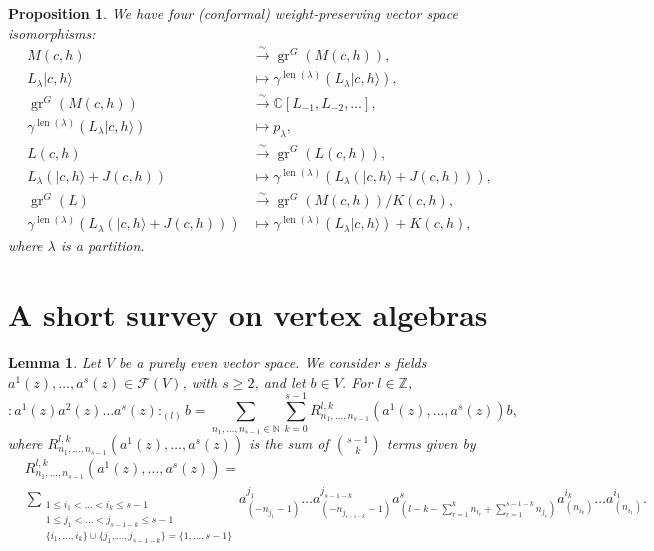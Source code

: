 \documentclass[a4paper, 12pt, reqno]{amsart}
\newtheorem{lemma}[theorem]{Lemma}
\newtheorem{proposition}[theorem]{Proposition}
\theoremstyle{remark}
\DeclareMathOperator{\len}{len}
\DeclareMathOperator{\gr}{gr}
\begin{document}
\begin{proposition}
  \label{prp:4}
  We have four (conformal) weight-preserving vector space isomorphisms:
  \begin{align*}
    M(c, h) &\xrightarrow{\sim} \gr^G(M(c, h)), \\
    L_{\lambda}|c, h\rangle &\mapsto \gamma^{\len(\lambda)}(L_{\lambda}|c, h\rangle), \\
    \gr^G(M(c, h)) &\xrightarrow{\sim} \mathbb{C}[L_{-1}, L_{-2}, \dots], \\
    \gamma^{\len(\lambda)}(L_{\lambda}|c, h\rangle) &\mapsto p_{\lambda}, \\
    L(c, h) &\xrightarrow{\sim} \gr^G(L(c, h)), \\
    L_{\lambda}(|c, h\rangle + J(c, h)) &\mapsto \gamma^{\len(\lambda)}(L_{\lambda}(|c, h\rangle + J(c, h))), \\
    \gr^G(L) &\xrightarrow{\sim} \gr^G(M(c, h))/K(c, h), \\
    \gamma^{\len(\lambda)}(L_{\lambda}(|c, h\rangle + J(c, h))) &\mapsto \gamma^{\len(\lambda)}(L_{\lambda}|c, h\rangle) + K(c, h),
  \end{align*}
  where $\lambda$ is a partition.
\end{proposition}

\section{A short survey on vertex algebras}
\label{sec:short-survey-vertex}

\begin{lemma}
  \label{lmm:1}
  Let $V$ be a purely even vector space.
  We consider $s$ fields $a^1(z), \dots, a^s(z) \in \mathcal{F}(V)$, with $s \ge 2$, and let $b \in V$.
  For $l \in \mathbb{Z}$,
  \begin{equation*}
    :a^1(z)a^2(z)\dots a^s(z):_{(l)}b = \sum_{n_1, \dots, n_{s - 1} \in \mathbb{N}}\sum_{k = 0}^{s - 1}R^{l, k}_{n_1, \dots, n_{s - 1}}(a^1(z), \dots, a^s(z))b,
  \end{equation*}
  where $R^{l, k}_{n_1, \dots, n_{s - 1}}(a^1(z), \dots, a^s(z))$ is the sum of $\binom{s - 1}{k}$ terms given by
  \begin{align*}
    &R^{l, k}_{n_1, \dots, n_{s - 1}}(a^1(z), \dots, a^s(z)) = \\
    &\sum_{\substack{1 \le i_1 < \dots < i_k \le s - 1 \\ 1 \le j_1 < \dots < j_{s - 1 - k} \le s - 1 \\ \{i_1, \dots, i_k\} \cup \{j_1, \dots, j_{s - 1 - k}\} = \{1, \dots, s - 1\}}}a^{j_1}_{(-n_{j_1} - 1)}\dots a^{j_{s - 1 - k}}_{(-n_{j_{s - 1 - k}} - 1)}a^s_{(l - k - \sum_{r = 1}^k n_{i_r} + \sum_{r = 1}^{s - 1 - k}n_{j_r})}a^{i_k}_{(n_{i_k})}\dots a^{i_1}_{(n_{i_1})}.
  \end{align*}
\end{lemma}
\end{document}
